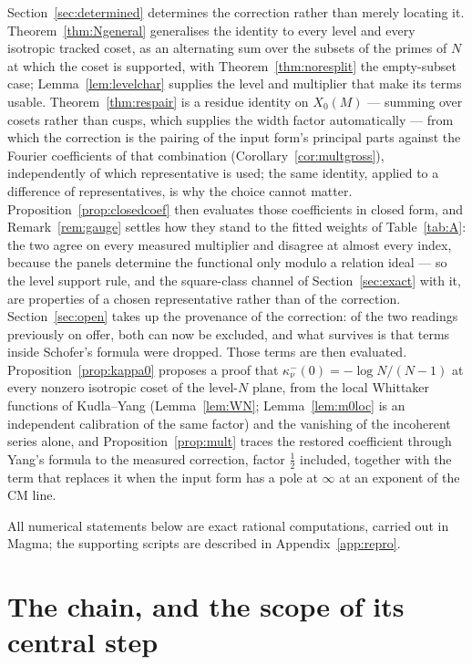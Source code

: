 \documentclass[11pt,reqno]{amsart}
\theoremstyle{plain}
\theoremstyle{definition}
\begin{document}
Section~\ref{sec:determined} determines the correction rather than merely locating it.
Theorem~\ref{thm:Ngeneral} generalises the identity to every level and every isotropic tracked
coset, as an alternating sum over the subsets of the primes of $N$ at which the coset is supported,
with Theorem~\ref{thm:noresplit} the empty-subset case; Lemma~\ref{lem:levelchar} supplies the level
and multiplier that make its terms usable. Theorem~\ref{thm:respair} is a residue identity on
$X_0(M)$ --- summing over cosets rather than cusps, which supplies the width factor automatically
--- from which the correction is the pairing of the input form's principal parts against the
Fourier coefficients of that combination (Corollary~\ref{cor:multgross}), independently of which
representative is used; the same identity, applied to a difference of representatives, is why the
choice cannot matter. Proposition~\ref{prop:closedcoef} then evaluates those coefficients in closed
form, and Remark~\ref{rem:gauge} settles how they stand to the fitted weights of
Table~\ref{tab:A}: the two agree on every measured multiplier and disagree at almost every index,
because the panels determine the functional only modulo a relation ideal --- so the level support
rule, and the square-class channel of Section~\ref{sec:exact} with it, are properties of a chosen
representative rather than of the correction. Section~\ref{sec:open} takes up the
provenance of the correction: of the two readings previously on offer, both can now be excluded,
and what survives is that terms inside Schofer's formula were dropped. Those terms are then
evaluated. Proposition~\ref{prop:kappa0} proposes a proof that $\kappa^-_\nu(0)=-\log N/(N-1)$ at every nonzero
isotropic coset of the level-$N$ plane, from the local Whittaker functions of Kudla--Yang
(Lemma~\ref{lem:WN}; Lemma~\ref{lem:m0loc} is an independent calibration of the same factor) and
the vanishing of the incoherent series alone, and Proposition~\ref{prop:mult} traces the restored
coefficient through Yang's formula to the measured correction, factor $\tfrac12$ included, together
with the term that replaces it when the input form has a pole at $\infty$ at an exponent of the CM
line.

All numerical statements below are exact rational computations, carried out in Magma; the
supporting scripts are described in Appendix~\ref{app:repro}.

\section{The chain, and the scope of its central step}\label{sec:chain}
\end{document}
